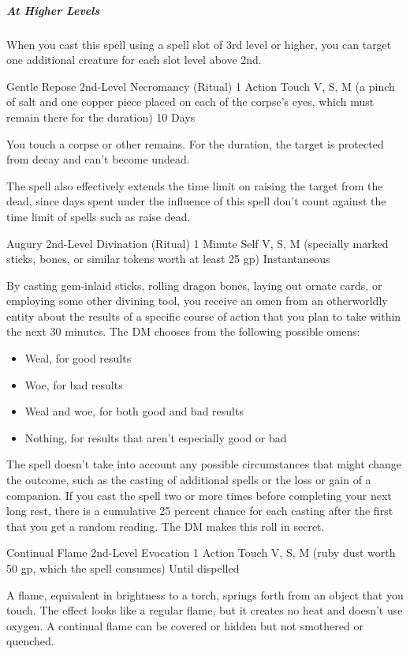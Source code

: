 {\subparagraph*{At Higher Levels} When you cast this spell using a spell slot of 3rd level or higher, you can target one additional creature for each slot level above 2nd.

\DndSpellHeader
  {Gentle Repose}
  {2nd-Level Necromancy (Ritual)}
  {1 Action}
  {Touch}
  {V, S, M (a pinch of salt and one copper piece placed on each of the corpse’s eyes, which must remain there for the duration)}
  {10 Days}

You touch a corpse or other remains. For the duration, the target is protected from decay and can’t become undead.

The spell also effectively extends the time limit on raising the target from the dead, since days spent under the influence of this spell don’t count against the time limit of spells such as raise dead.

\DndSpellHeader
  {Augury}
  {2nd-Level Divination (Ritual)}
  {1 Minute}
  {Self}
  {V, S, M (specially marked sticks, bones, or similar tokens worth at least 25 gp)}
  {Instantaneous}

By casting gem-inlaid sticks, rolling dragon bones, laying out ornate cards, or employing some other divining tool, you receive an omen from an otherworldly entity about the results of a specific course of action that you plan to take within the next 30 minutes. The DM chooses from the following possible omens:
\begin{itemize}
	\item Weal, for good results
	\item Woe, for bad results
	\item Weal and woe, for both good and bad results
	\item Nothing, for results that aren’t especially good or bad
\end{itemize}
The spell doesn’t take into account any possible circumstances that might change the outcome, such as the casting of additional spells or the loss or gain of a companion. If you cast the spell two or more times before completing your next long rest, there is a cumulative 25 percent chance for each casting after the first that you get a random reading. The DM makes this roll in secret.

\DndSpellHeader
  {Continual Flame}
  {2nd-Level Evocation}
  {1 Action}
  {Touch}
  {V, S, M (ruby dust worth 50 gp, which the spell consumes)}
  {Until dispelled}

A flame, equivalent in brightness to a torch, springs forth from an object that you touch. The effect looks like a regular flame, but it creates no heat and doesn’t use oxygen. A continual flame can be covered or hidden but not smothered or quenched.

}
